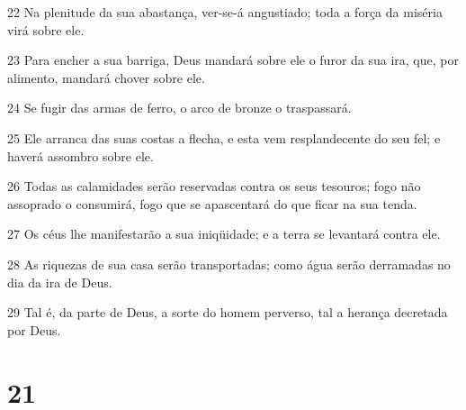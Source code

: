 \par 22 Na plenitude da sua abastança, ver-se-á angustiado; toda a força da miséria virá sobre ele.
\par 23 Para encher a sua barriga, Deus mandará sobre ele o furor da sua ira, que, por alimento, mandará chover sobre ele.
\par 24 Se fugir das armas de ferro, o arco de bronze o traspassará.
\par 25 Ele arranca das suas costas a flecha, e esta vem resplandecente do seu fel; e haverá assombro sobre ele.
\par 26 Todas as calamidades serão reservadas contra os seus tesouros; fogo não assoprado o consumirá, fogo que se apascentará do que ficar na sua tenda.
\par 27 Os céus lhe manifestarão a sua iniqüidade; e a terra se levantará contra ele.
\par 28 As riquezas de sua casa serão transportadas; como água serão derramadas no dia da ira de Deus.
\par 29 Tal é, da parte de Deus, a sorte do homem perverso, tal a herança decretada por Deus.

\chapter{21}

